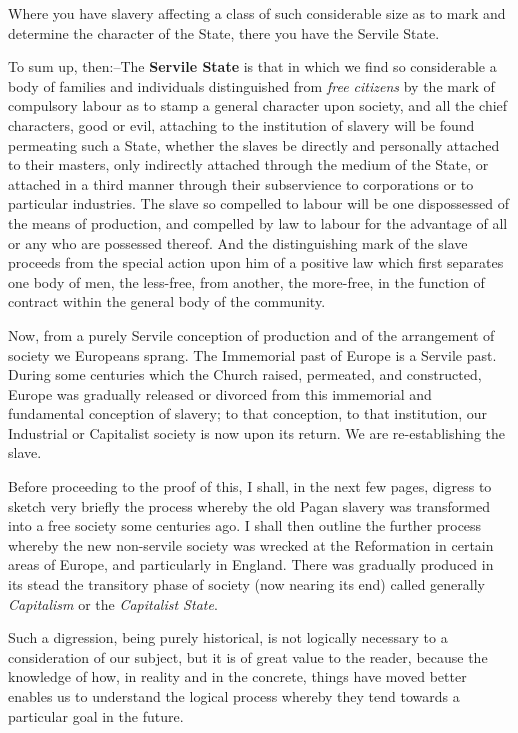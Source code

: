\documentclass{book}
\newcommand\mdstrong[1]{\textbf{#1}}
\begin{document}
Where you have slavery affecting a class of such considerable size as to mark and determine the character of the State, there you have the Servile State.

To sum up, then:–The \mdstrong{Servile State} is that in which we find so considerable a body of families and individuals distinguished from \emph{free citizens} by the mark of compulsory labour as to stamp a general character upon society, and all the chief characters, good or evil, attaching to the institution of slavery will be found permeating such a State, whether the slaves be directly and personally attached to their masters, only indirectly attached through the medium of the State, or attached in a third manner through their subservience to corporations or to particular industries. The slave so compelled to labour will be one dispossessed of the means of production, and compelled by law to labour for the advantage of all or any who are possessed thereof. And the distinguishing mark of the slave proceeds from the special action upon him of a positive law which first separates one body of men, the less-free, from another, the more-free, in the function of contract within the general body of the community.

Now, from a purely Servile conception of production and of the arrangement of society we Europeans sprang. The Immemorial past of Europe is a Servile past. During some centuries which the Church raised, permeated, and constructed, Europe was gradually released or divorced from this immemorial and fundamental conception of slavery; to that conception, to that institution, our Industrial or Capitalist society is now upon its return. We are re-establishing the slave.

Before proceeding to the proof of this, I shall, in the next few pages, digress to sketch very briefly the process whereby the old Pagan slavery was transformed into a free society some centuries ago. I shall then outline the further process whereby the new non-servile society was wrecked at the Reformation in certain areas of Europe, and particularly in England. There was gradually produced in its stead the transitory phase of society (now nearing its end) called generally \emph{Capitalism} or the \emph{Capitalist State}.

Such a digression, being purely historical, is not logically necessary to a consideration of our subject, but it is of great value to the reader, because the knowledge of how, in reality and in the concrete, things have moved better enables us to understand the logical process whereby they tend towards a particular goal in the future.
\end{document}
